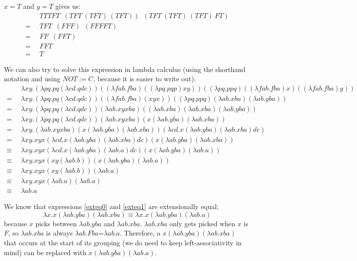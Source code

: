 \documentclass[11pt]{article}
\begin{document}
\(x=T\) and \(y=T\) gives us:
\begin{align*}
	&\enspace TTTFT\enspace
		(TFT\:(TFT)\:(TFT))\enspace
		(TFT\:(TFT)\:(TFT)\:FT)\\
	=&\enspace TFT\enspace(FFF)\enspace(FFFFT)\\
	=&\enspace FF\enspace(FFT)\\
	=&\enspace FFT\\
	=&\enspace T
\end{align*}

We can also try to solve this expression in lambda calculus (using the
shorthand notation and using \(NOT:=C\), because it is easier to write out):
\small
\begin{align}
	&\enspace\lambda xy.
		(\lambda pq.pq(\lambda cd.qdc))
		((\lambda fab.fba)((\lambda pq.pqp)xy))
		((\lambda pq.ppq)((\lambda fab.fba)x)((\lambda fab.fba)y))\\
	=&\enspace\lambda xy.
		(\lambda pq.pq(\lambda cd.qdc))
		((\lambda fab.fba)(xyx))
		((\lambda pq.ppq)(\lambda ab.xba)(\lambda ab.yba))\\
	=&\enspace\lambda xy.
		(\lambda pq.pq(\lambda cd.qdc))
		(\lambda ab.xyxba)
		((\lambda ab.xba)(\lambda ab.xba)(\lambda ab.yba))\\
	=&\enspace\lambda xy.
		(\lambda pq.pq(\lambda cd.qdc))
		(\lambda ab.xyxba)
		(x(\lambda ab.yba)(\lambda ab.xba))\\
	=&\enspace\lambda xy.
		(\lambda ab.xyxba)
		(x(\lambda ab.yba)(\lambda ab.xba))
		(\lambda cd.x(\lambda ab.yba)(\lambda ab.xba)dc)\\
	=&\enspace\lambda xy.\label{exteq0}
		xyx
		(\lambda cd.x(\lambda ab.yba)(\lambda ab.xba)dc)
		(x(\lambda ab.yba)(\lambda ab.xba))\\
	\equiv&\enspace\lambda xy.\label{exteq1}
		xyx
		(\lambda cd.x(\lambda ab.yba)(\lambda ab.a)dc)
		(x(\lambda ab.yba)(\lambda ab.a))\\
	\equiv&\enspace\lambda xy.\label{exteq2}
		xyx
		(xy(\lambda ab.b))
		(x(\lambda ab.yba)(\lambda ab.a))\\
	\equiv&\enspace\lambda xy.\label{exteq3}
		xyx
		(xy(\lambda ab.b))
		(\lambda ab.a)\\
	\equiv&\enspace\lambda xy.\label{exteq4}
		xyx
		(\lambda ab.a)
		(\lambda ab.a)\\
	\equiv&\enspace\lambda ab.a\label{exteq5}
\end{align}
\normalsize

We know that expressions \ref{exteq0} and \ref{exteq1} are extensionally equal;
\[
	\lambda x.x(\lambda ab.yba)(\lambda ab.xba)\equiv
	\lambda x.x(\lambda ab.yba)(\lambda ab.a)
\]
because \(x\) picks between \(\lambda ab.yba\) and \(\lambda ab.xba\).
\(\lambda ab.xba\) only gets picked when \(x\) is \(F\), so \(\lambda ab.xba\)
is always \(\lambda ab.Fba\)=\(\lambda ab.a\). Therefore, a \(x(\lambda
ab.yba)(\lambda ab.xba)\) that occurs at the start of its grouping (we do need
to keep left-associativity in mind) can be replaced with \(x(\lambda
ab.yba)(\lambda ab.a)\).
\end{document}
